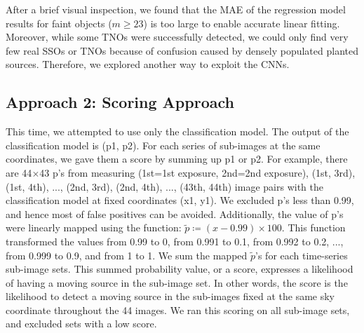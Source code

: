 \documentclass{aastex631}
\begin{document}

After a brief visual inspection, we found that the MAE of the regression model results for faint objects ($m\geq23$) is too large to enable accurate linear fitting.
Moreover, while some TNOs were successfully detected, we could only find very few real SSOs or TNOs because of confusion caused by densely populated planted sources.
Therefore, we explored another way to exploit the CNNs.

\subsection{Approach 2: Scoring Approach}
\label{subsect: Scoring Approach}

This time, we attempted to use only the classification model.
The output of the classification model is (p1, p2).
For each series of sub-images at the same coordinates, we gave them a score by summing up p1 or p2.
For example, there are 44$\times$43 p's from measuring (1st=1st exposure, 2nd=2nd exposure), (1st, 3rd), (1st, 4th), ..., (2nd, 3rd), (2nd, 4th), ..., (43th, 44th) image pairs with the classification model at fixed coordinates (x1, y1).
We excluded p's less than 0.99, and hence most of false positives can be avoided.
Additionally, the value of p's were linearly mapped using the function: $\tilde{p} \coloneqq (x-0.99)\times100$. This function transformed the values from 0.99 to 0, from 0.991 to 0.1, from 0.992 to 0.2, ..., from 0.999 to 0.9, and from 1 to 1.
We sum the mapped $\tilde{p}$'s for each time-series sub-image sets.
This summed probability value, or a score, expresses a likelihood of having a moving source in the sub-image set.
In other words, the score is the likelihood to detect a moving source in the sub-images fixed at the same sky coordinate throughout the 44 images.
We ran this scoring on all sub-image sets, and excluded sets with a low score.
\end{document}
